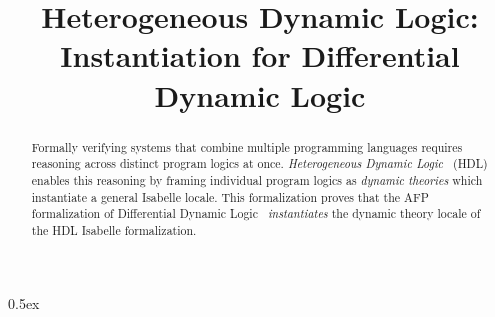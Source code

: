 \documentclass[11pt,a4paper]{article}
\begin{document}
\title{Heterogeneous Dynamic Logic:\\Instantiation for Differential Dynamic Logic}
\maketitle

\begin{abstract}
Formally verifying systems that combine multiple programming
languages requires reasoning across distinct program logics at once.
\emph{Heterogeneous Dynamic Logic}~\cite{DBLP:journals/corr/abs-2507-08581} (HDL) enables this reasoning by framing individual
program logics as \emph{dynamic theories} which instantiate a general Isabelle locale.
This formalization proves that the AFP formalization of Differential Dynamic Logic~\cite{Differential_Dynamic_Logic-AFP} \emph{instantiates}
the dynamic theory locale of the HDL Isabelle formalization.
\end{abstract}

\tableofcontents

\parindent 0pt\parskip 0.5ex





\end{document}
